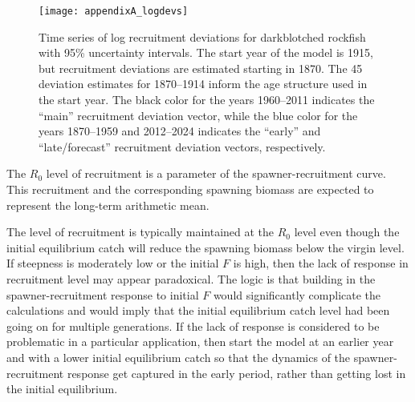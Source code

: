 \begin{figure}[H]
	\begin{center}
		\texttt{[image: appendixA\_logdevs]}\\
	\end{center}
	\caption{Time series of log recruitment deviations for darkblotched rockfish with 95\% uncertainty intervals. The start year of the model is 1915, but recruitment deviations are estimated starting in 1870. The 45 deviation estimates for 1870--1914 inform the age structure used in the start year. The black color for the years 1960--2011 indicates the ``main'' recruitment deviation vector, while the blue color for the years 1870--1959 and 2012--2024 indicates the ``early'' and ``late/forecast'' recruitment deviation vectors, respectively.}
	\label{fig:recdevs}
\end{figure}

The $R_{0}$ level of recruitment is a parameter of the spawner-recruitment curve. This recruitment and the corresponding spawning biomass are expected to represent the long-term arithmetic mean.

The level of recruitment is typically maintained at the $R_{0}$ level even though the initial equilibrium catch will reduce the spawning biomass below the virgin level. If steepness is moderately low or the initial $F$ is high, then the lack of response in recruitment level may appear paradoxical. The logic is that building in the spawner-recruitment response to initial $F$ would significantly complicate the calculations and would imply that the initial equilibrium catch level had been going on for multiple generations. If the lack of response is considered to be problematic in a particular application, then start the model at an earlier year and with a lower initial equilibrium catch so that the dynamics of the spawner-recruitment response get captured in the early period, rather than getting lost in the initial equilibrium.


